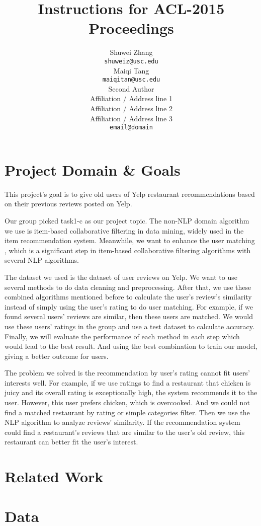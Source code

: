 \documentclass[11pt]{article}
\title{Instructions for ACL-2015 Proceedings}
\author{
  Shuwei Zhang \\
  {\tt shuweiz@usc.edu} \\\And
  Maiqi Tang \\
  {\tt maiqitan@usc.edu} \\\And
  Second Author \\
  Affiliation / Address line 1 \\
  Affiliation / Address line 2 \\
  Affiliation / Address line 3 \\
  {\tt email@domain} \\
  }
\date{}
\begin{document}
\maketitle

\section{Project Domain \& Goals}
This project’s goal is to give old users of Yelp restaurant recommendations based on their previous reviews posted on Yelp. 

Our group picked task1-c as our project topic. The non-NLP domain algorithm we use is item-based collaborative filtering in data mining, widely used in the item recommendation system. Meanwhile, we want to enhance the user matching , which is a significant step in item-based collaborative filtering algorithms with several NLP algorithms. 

The dataset we used is the dataset of user reviews on Yelp. We want to use several methods to do data cleaning and preprocessing. After that, we use these combined algorithms mentioned before to calculate the user’s review’s similarity instead of simply using the user's rating to do user matching. For example, if we found several users’ reviews are similar, then these users are matched. We would use these users’ ratings in the group and use a test dataset to calculate accuracy. Finally, we will evaluate the performance of each method in each step which would lead to the best result. And using the best combination to train our model, giving a better outcome for users.

The problem we solved is the recommendation by user's rating cannot fit users' interests well. For example, if we use ratings to find a restaurant that chicken is juicy and its overall rating is exceptionally high, the system recommends it to the user. However, this user prefers chicken, which is overcooked. And we could not find a matched restaurant by rating or simple categories filter. Then we use the NLP algorithm to analyze reviews' similarity. If the recommendation system could find a restaurant's reviews that are similar to the user's old review, this restaurant can better fit the user's interest.

\section{Related Work}

\section{Data}
\end{document}
